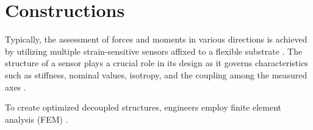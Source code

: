 \section{Constructions}
\label{lr_constructions}

Typically, the assessment of forces and moments in various directions is achieved by utilizing multiple strain-sensitive sensors affixed to a 
flexible substrate \cite{multi_axis_force_sensors_review}. The structure of a sensor plays a crucial role in its design as it governs 
characteristics such as stiffness, nominal values, isotropy, and the coupling among the measured axes 
\cite*{multi_axis_force_sensors_review,beam_structure_math}. 

To create optimized decoupled structures, engineers employ finite element analysis (FEM) 
\cite*{1990_optic, multi_axis_force_sensors_review, beam_structure_math}.



